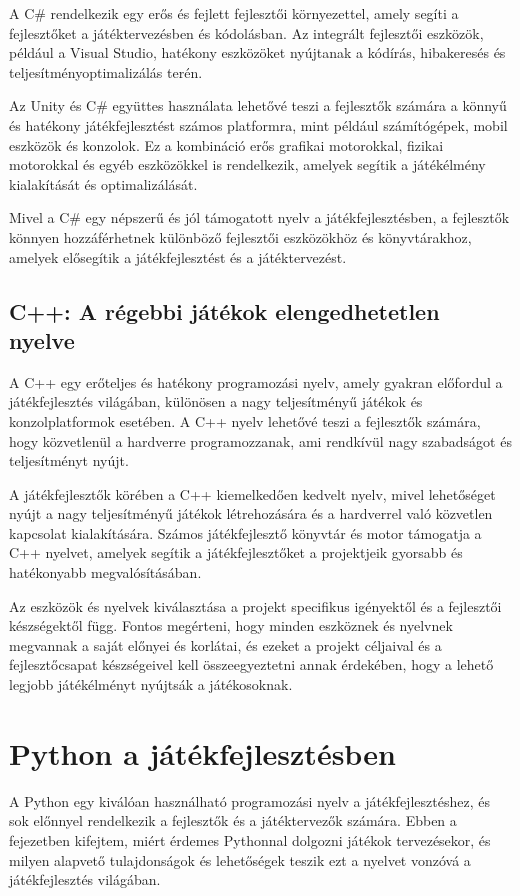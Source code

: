 A C\# rendelkezik egy erős és fejlett fejlesztői környezettel, amely segíti a fejlesztőket a játéktervezésben és kódolásban. Az integrált fejlesztői eszközök, például a Visual Studio, hatékony eszközöket nyújtanak a kódírás, hibakeresés és teljesítményoptimalizálás terén.

Az Unity és C\# együttes használata lehetővé teszi a fejlesztők számára a könnyű és hatékony játékfejlesztést számos platformra, mint például számítógépek, mobil eszközök és konzolok. Ez a kombináció erős grafikai motorokkal, fizikai motorokkal és egyéb eszközökkel is rendelkezik, amelyek segítik a játékélmény kialakítását és optimalizálását.

Mivel a C\# egy népszerű és jól támogatott nyelv a játékfejlesztésben, a fejlesztők könnyen hozzáférhetnek különböző fejlesztői eszközökhöz és könyvtárakhoz, amelyek elősegítik a játékfejlesztést és a játéktervezést.
\subsection{C++: A régebbi játékok elengedhetetlen nyelve}\cite{cpp-doc}

A C++ egy erőteljes és hatékony programozási nyelv, amely gyakran előfordul a játékfejlesztés világában, különösen a nagy teljesítményű játékok és konzolplatformok esetében. A C++ nyelv lehetővé teszi a fejlesztők számára, hogy közvetlenül a hardverre programozzanak, ami rendkívül nagy szabadságot és teljesítményt nyújt.

A játékfejlesztők körében a C++ kiemelkedően kedvelt nyelv, mivel lehetőséget nyújt a nagy teljesítményű játékok létrehozására és a hardverrel való közvetlen kapcsolat kialakítására. Számos játékfejlesztő könyvtár és motor támogatja a C++ nyelvet, amelyek segítik a játékfejlesztőket a projektjeik gyorsabb és hatékonyabb megvalósításában.

Az eszközök és nyelvek kiválasztása a projekt specifikus igényektől és a fejlesztői készségektől függ. Fontos megérteni, hogy minden eszköznek és nyelvnek megvannak a saját előnyei és korlátai, és ezeket a projekt céljaival és a fejlesztőcsapat készségeivel kell összeegyeztetni annak érdekében, hogy a lehető legjobb játékélményt nyújtsák a játékosoknak.


\section{Python a játékfejlesztésben}

A Python egy kiválóan használható programozási nyelv a játékfejlesztéshez, és sok előnnyel rendelkezik a fejlesztők és a játéktervezők számára. Ebben a fejezetben kifejtem, miért érdemes Pythonnal dolgozni játékok tervezésekor, és milyen alapvető tulajdonságok és lehetőségek teszik ezt a nyelvet vonzóvá a játékfejlesztés világában.

